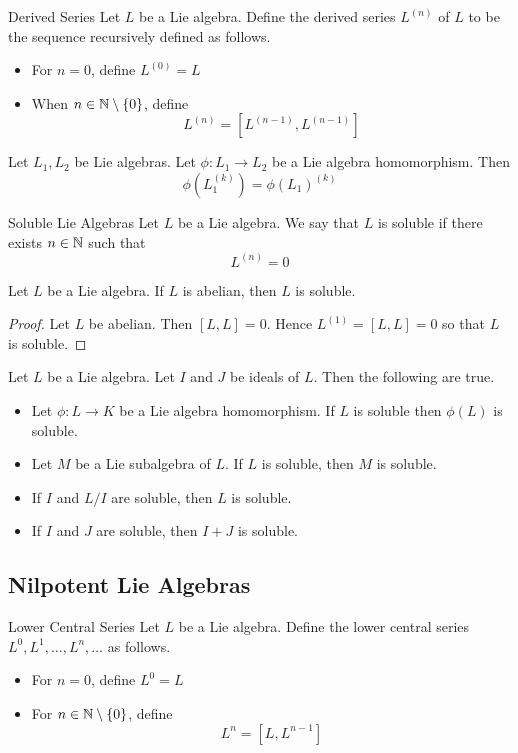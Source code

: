 \documentclass[a4paper]{article}
\begin{document}
\begin{defn}{Derived Series}{} Let $L$ be a Lie algebra. Define the derived series $L^{(n)}$ of $L$ to be the sequence recursively defined as follows. 
\begin{itemize}
\item For $n=0$, define $L^{(0)}=L$
\item When $n\in\mathbb{N}\setminus\{0\}$, define $$L^{(n)}=[L^{(n-1)},L^{(n-1)}]$$
\end{itemize}
\end{defn}

\begin{lmm}{}{} Let $L_1,L_2$ be Lie algebras. Let $\phi:L_1\to L_2$ be a Lie algebra homomorphism. Then $$\phi(L_1^{(k)})=\phi(L_1)^{(k)}$$
\end{lmm}

\begin{defn}{Soluble Lie Algebras}{} Let $L$ be a Lie algebra. We say that $L$ is soluble if there exists $n\in\mathbb{N}$ such that $$L^{(n)}=0$$
\end{defn}

\begin{lmm}{}{} Let $L$ be a Lie algebra. If $L$ is abelian, then $L$ is soluble. \tcbline
\begin{proof}
Let $L$ be abelian. Then $[L,L]=0$. Hence $L^{(1)}=[L,L]=0$ so that $L$ is soluble. 
\end{proof}
\end{lmm}

\begin{prp}{}{} Let $L$ be a Lie algebra. Let $I$ and $J$ be ideals of $L$. Then the following are true. 
\begin{itemize}
\item Let $\phi:L\to K$ be a Lie algebra homomorphism. If $L$ is soluble then $\phi(L)$ is soluble. 
\item Let $M$ be a Lie subalgebra of $L$. If $L$ is soluble, then $M$ is soluble. 
\item If $I$ and $L/I$ are soluble, then $L$ is soluble. 
\item If $I$ and $J$ are soluble, then $I+J$ is soluble. 
\end{itemize}
\end{prp}

\subsection{Nilpotent Lie Algebras}
\begin{defn}{Lower Central Series}{} Let $L$ be a Lie algebra. Define the lower central series $L^0,L^1,\dots,L^n,\dots$ as follows. 
\begin{itemize}
\item For $n=0$, define $L^0=L$
\item For $n\in\mathbb{N}\setminus\{0\}$, define $$L^n=[L,L^{n-1}]$$
\end{itemize}
\end{defn}
\end{document}

